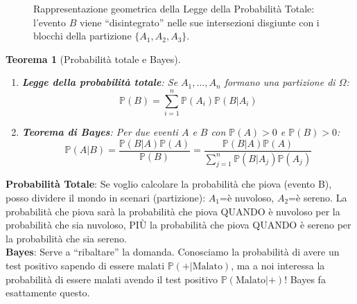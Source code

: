 \documentclass[11pt, a4paper]{report}
\theoremstyle{plain}
\newtheorem{theorem}{Teorema}[chapter]
\theoremstyle{definition}
\theoremstyle{remark}
\newcommand{\PP}{\mathbb{P}}
\newcommand{\1}{\mathbf{1}}
\begin{document}
\begin{figure}[htbp]
\centering
{}
\caption{Rappresentazione geometrica della Legge della Probabilità Totale: l'evento $B$ viene ``disintegrato'' nelle sue intersezioni disgiunte con i blocchi della partizione $\{A_1, A_2, A_3\}$.}
\label{fig:prob_totale}
\end{figure}

\begin{theorem}[{Probabilità totale e Bayes}]
\begin{enumerate}
    \item \textbf{Legge della probabilità totale}: Se $A_1, \dots, A_n$ formano una partizione di $\Omega$:
    \[ \PP(B) = \sum_{i=1}^n \PP(A_i) \PP(B|A_i) \]
    \item \textbf{Teorema di Bayes}: Per due eventi $A$ e $B$ con $\PP(A)>0$ e $\PP(B)>0$:
    \[ \PP(A|B) = \frac{\PP(B|A)\PP(A)}{\PP(B)} = \frac{\PP(B|A)\PP(A)}{\sum_{j=1}^n \PP(B|A_j)\PP(A_j)} \]
\end{enumerate}
\end{theorem}

\begin{spiegazione}
    \textbf{Probabilità Totale}: Se voglio calcolare la probabilità che piova (evento B), posso dividere il mondo in scenari (partizione): $A_1$=è nuvoloso, $A_2$=è sereno. La probabilità che piova sarà la probabilità che piova QUANDO è nuvoloso per la probabilità che sia nuvoloso, PIÙ la probabilità che piova QUANDO è sereno per la probabilità che sia sereno. \\
    \textbf{Bayes}: Serve a ``ribaltare'' la domanda. Conosciamo la probabilità di avere un test positivo sapendo di essere malati $\PP(+|\text{Malato})$, ma a noi interessa la probabilità di essere malati avendo il test positivo $\PP(\text{Malato}|+)$! Bayes fa esattamente questo.
\end{spiegazione}
\end{document}
